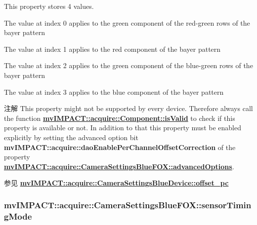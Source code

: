 This property stores 4 values.
\begin{DoxyItemize}
\item The value at index 0 applies to the green component of the red-\/green rows of the bayer pattern
\item The value at index 1 applies to the red component of the bayer pattern
\item The value at index 2 applies to the green component of the blue-\/green rows of the bayer pattern
\item The value at index 3 applies to the blue component of the bayer pattern
\end{DoxyItemize}

\begin{DoxyNote}{注解}
This property might not be supported by every device. Therefore always call the function {\bfseries \hyperlink{classmv_i_m_p_a_c_t_1_1acquire_1_1_component_ac51e55e7e046101f3c6119d84123abd5}{mv\+I\+M\+P\+A\+C\+T\+::acquire\+::\+Component\+::is\+Valid}} to check if this property is available or not. In addition to that this property must be enabled explicitly by setting the advanced option bit {\bfseries mv\+I\+M\+P\+A\+C\+T\+::acquire\+::dao\+Enable\+Per\+Channel\+Offset\+Correction} of the property {\bfseries \hyperlink{classmv_i_m_p_a_c_t_1_1acquire_1_1_camera_settings_blue_f_o_x_ab121de32a400194b4313fbadfa3abf01}{mv\+I\+M\+P\+A\+C\+T\+::acquire\+::\+Camera\+Settings\+Blue\+F\+O\+X\+::advanced\+Options}}. 
\end{DoxyNote}
\begin{DoxySeeAlso}{参见}
{\bfseries \hyperlink{classmv_i_m_p_a_c_t_1_1acquire_1_1_camera_settings_blue_device_aa3bbc947f98f3182b8bd0121a511b1c2}{mv\+I\+M\+P\+A\+C\+T\+::acquire\+::\+Camera\+Settings\+Blue\+Device\+::offset\+\_\+pc}} 
\end{DoxySeeAlso}
\hypertarget{classmv_i_m_p_a_c_t_1_1acquire_1_1_camera_settings_blue_f_o_x_a82207f8af714d74c943d0cc2725cb7c8}{
\subsubsection[{sensor\+Timing\+Mode}]{ mv\+I\+M\+P\+A\+C\+T\+::acquire\+::\+Camera\+Settings\+Blue\+F\+O\+X\+::sensor\+Timing\+Mode}}\label{classmv_i_m_p_a_c_t_1_1acquire_1_1_camera_settings_blue_f_o_x_a82207f8af714d74c943d0cc2725cb7c8}


